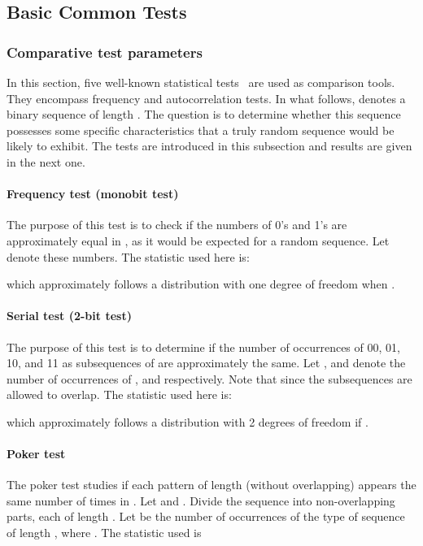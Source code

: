 \documentclass[journal]{IEEEtran}
\begin{document}
\subsection{Basic Common Tests}


\subsubsection{Comparative test parameters}
In this section, five well-known statistical tests~\cite{Menezes1997} are used as comparison tools. They encompass frequency and autocorrelation tests. In what follows,  denotes a binary sequence of length . The question is to determine whether this sequence possesses some specific characteristics that a truly random sequence would be likely to exhibit. The tests are introduced in this subsection and results are given in the next one.

\paragraph{Frequency test (monobit test)}
The purpose of this test is to check if the numbers of 0's and 1's are approximately equal in , as it would be expected for a random sequence. Let  denote these numbers. The statistic used here is:

\noindent which approximately follows a  distribution with one degree of freedom when .

\paragraph{Serial test (2-bit test)}
The purpose of this test is to determine if the number of occurrences of 00, 01, 10, and 11 as subsequences of  are approximately the same. Let , and  denote the number of occurrences of , and  respectively. Note that  since the subsequences are allowed to overlap. The
statistic used here is:

\noindent which approximately follows a  distribution with 2 degrees of freedom if .

\paragraph{Poker test}
The poker test studies if each pattern of length  (without overlapping) appears the same number of times in . Let  and . Divide the sequence  into  non-overlapping parts, each of length . Let  be the number of occurrences of the  type of sequence of length , where . The statistic used is
\end{document}
